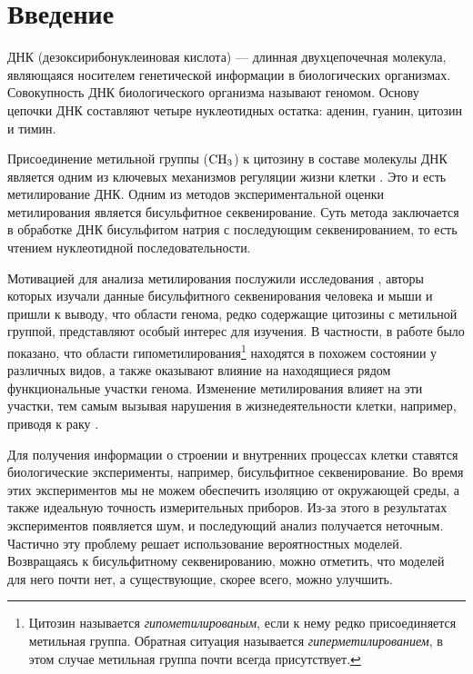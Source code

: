 
\section*{Введение}

ДНК (дезоксирибонуклеиновая кислота) --- длинная двухцепочечная молекула, являющаяся носителем
генетической информации в биологических организмах. Совокупность ДНК биологического организма
называют геномом. Основу цепочки ДНК составляют четыре нуклеотидных остатка: аденин, гуанин, цитозин и
тимин.


Присоединение метильной группы ($\operatorname{CH}_3$) к цитозину в составе молекулы ДНК является
одним из ключевых механизмов регуляции жизни клетки \cite{Smith2013}. Это и есть
метилирование ДНК. Одним из методов экспериментальной оценки метилирования является
бисульфитное секвенирование. Суть метода заключается в обработке ДНК бисульфитом натрия с
последующим секвенированием, то есть чтением нуклеотидной последовательности.

Мотивацией для анализа метилирования послужили исследования
\cite{lister2009human,Stadler2011,Xie2013}, авторы которых изучали данные бисульфитного
секвенирования человека и мыши и пришли к выводу, что области генома, редко содержащие
цитозины с метильной группой, представляют особый интерес для изучения. В частности,
в работе \cite{Stadler2011} было показано, что области гипометилирования\footnote{
Цитозин называется \emph{гипометилированым}, если к нему редко присоединяется метильная группа.
Обратная ситуация называется \emph{гиперметилированием}, в этом случае метильная группа почти
всегда присутствует.} находятся в похожем состоянии у различных видов, а также оказывают
влияние на находящиеся рядом функциональные участки генома. Изменение метилирования
влияет на эти участки, тем самым вызывая нарушения в жизнедеятельности клетки, например,
приводя к раку \cite{Xie2013}.

Для получения информации о строении и внутренних процессах клетки ставятся
биологические эксперименты, например, бисульфитное секвенирование. Во время
этих экспериментов мы не можем обеспечить изоляцию от окружающей среды, а
также идеальную точность измерительных приборов. Из-за этого в результатах
экспериментов появляется шум, и последующий анализ получается неточным. Частично
эту проблему решает использование вероятностных моделей. Возвращаясь к бисульфитному
секвенированию, можно отметить, что моделей для него почти нет, а существующие,
скорее всего, можно улучшить.

